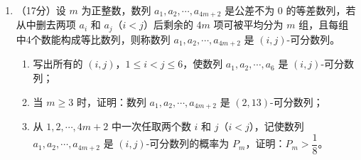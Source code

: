 \documentclass[12pt,a4paper]{article}
\begin{document}
\begin{enumerate}[label=\arabic*.]
\vspace{0.3cm}

\item （17分）设 $m$ 为正整数，数列 $a_1,a_2,\cdots,a_{4m+2}$ 是公差不为 $0$ 的等差数列，若从中删去两项 $a_i$ 和 $a_j$（$i<j$）后剩余的 $4m$ 项可被平均分为 $m$ 组，且每组中4个数能构成等比数列，则称数列 $a_1,a_2,\cdots,a_{4m+2}$ 是 $(i,j)$-可分数列。
\begin{enumerate}[label=(\arabic*)]
\item 写出所有的 $(i,j)$，$1\leqslant i<j\leqslant 6$，使数列 $a_1,a_2,\cdots,a_6$ 是 $(i,j)$-可分数列；
\item 当 $m\geqslant 3$ 时，证明：数列 $a_1,a_2,\cdots,a_{4m+2}$ 是 $(2,13)$-可分数列；
\item 从 $1,2,\cdots,4m+2$ 中一次任取两个数 $i$ 和 $j$（$i<j$），记使数列 $a_1,a_2,\cdots,a_{4m+2}$ 是 $(i,j)$-可分数列的概率为 $P_m$，证明：$P_m>\dfrac{1}{8}$。
\end{enumerate}

\end{enumerate}
\end{document}
